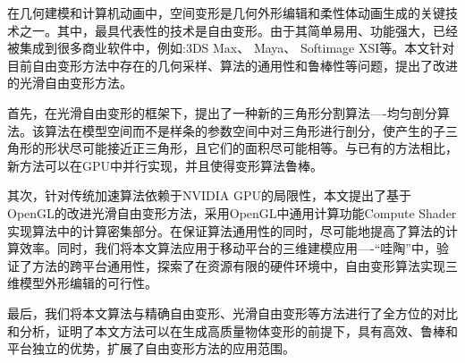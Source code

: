 
\begin{cabstract}

    在几何建模和计算机动画中，空间变形是几何外形编辑和柔性体动画生成的关键技术之一。其中，最具代表性的技术是自由变形。由于其简单易用、功能强大，已经被集成到很多商业软件中，例如:3DS Max、 Maya、 Softimage XSI等。本文针对目前自由变形方法中存在的几何采样、算法的通用性和鲁棒性等问题，提出了改进的光滑自由变形方法。

    首先，在光滑自由变形的框架下，提出了一种新的三角形分割算法----均匀剖分算法。该算法在模型空间而不是样条的参数空间中对三角形进行剖分，使产生的子三角形的形状尽可能接近正三角形，且它们的面积尽可能相等。与已有的方法相比，新方法可以在GPU中并行实现，并且使得变形算法鲁棒。

    其次，针对传统加速算法依赖于NVIDIA GPU的局限性，本文提出了基于OpenGL的改进光滑自由变形方法，采用OpenGL中通用计算功能Compute Shader实现算法中的计算密集部分。在保证算法通用性的同时，尽可能地提高了算法的计算效率。同时，我们将本文算法应用于移动平台的三维建模应用----“哇陶”中，验证了方法的跨平台通用性，探索了在资源有限的硬件环境中，自由变形算法实现三维模型外形编辑的可行性。

    最后，我们将本文算法与精确自由变形、光滑自由变形等方法进行了全方位的对比和分析，证明了本文方法可以在生成高质量物体变形的前提下，具有高效、鲁棒和平台独立的优势，扩展了自由变形方法的应用范围。

\end{cabstract}

